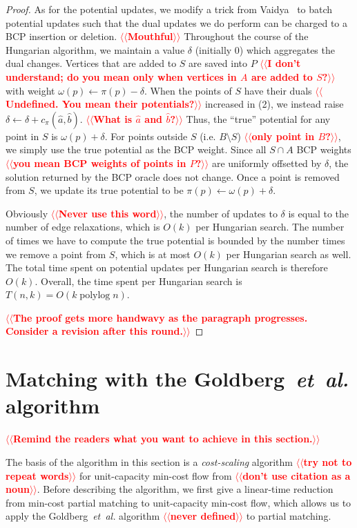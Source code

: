 \documentclass[11pt]{article}
\makeatletter
\def\etal{\textsl{et~al.}}
\def\polylog{\mathop{\mathrm{polylog}}}
\theoremstyle{plain}
\numberwithin{figure}{section}
\def\n@te#1{\textsf{\boldmath \textbf{$\langle\!\langle$#1$\rangle\!\rangle$}}\leavevmode}
\def\note#1{\textcolor{red}{\n@te{#1}}}
\makeatother
\begin{document}
\begin{proof}
As for the potential updates,
we modify a trick from Vaidya~\cite{Vaidya89} to batch potential
updates such that the dual updates we do perform can be charged to a
BCP insertion or deletion. \note{Mouthful}
Throughout the course of the Hungarian algorithm, we maintain a value
$\delta$ (initially 0) which aggregates the dual changes.
Vertices that are added to $S$ are saved into $P$ \note{I don't understand; do you mean only when vertices in $A$ are added to $S$?} with weight
$\omega(p) \gets \pi(p) - \delta$.
When the points of $S$ have their duals \note{Undefined. You mean their potentials?} increased in (2), we instead
raise $\delta \gets \delta + c_\pi(\hat{a}, \hat{b})$. \note{What is $\hat{a}$ and $\hat{b}$?}
Thus, the ``true'' potential for any point in $S$ is
$\omega(p) + \delta$.
For points outside $S$ (i.e. $B \setminus S$) \note{only point in $B$?}, we simply use the true
potential as the BCP weight.
Since all $S \cap A$ BCP weights \note{you mean BCP weights of points in $P$?} are uniformly offsetted by $\delta$, the solution returned by the BCP oracle does not change.
Once a point is removed from $S$, we update its true potential
to be $\pi(p) \gets \omega(p) + \delta$.

Obviously \note{Never use this word}, the number of updates to $\delta$ is equal to the number of
edge relaxations, which is $O(k)$ per Hungarian search.
The number of times we have to compute the true potential is bounded by
the number times we remove a point from $S$, which is at most $O(k)$ per Hungarian search as well.
The total time spent on potential updates per Hungarian search is therefore
$O(k)$.
Overall, the time spent per Hungarian search is $T(n, k) = O(k\polylog n)$.

\note{The proof gets more handwavy as the paragraph progresses.  Consider a revision after this round.}
\end{proof}


\section{Matching with the Goldberg~{\etal} algorithm}
\label{section:goldberg}

\note{Remind the readers what you want to achieve in this section.}

The basis of the algorithm in this section is a \emph{cost-scaling} algorithm \note{try not to repeat words}
for unit-capacity min-cost flow from \cite{GHKT17} \note{don't use citation as a noun}.
Before describing the algorithm, we first give a linear-time reduction from
min-cost partial matching to unit-capacity min-cost flow, which allows us to apply the
Goldberg~{\etal} algorithm \note{never defined} to partial matching.
\end{document}
